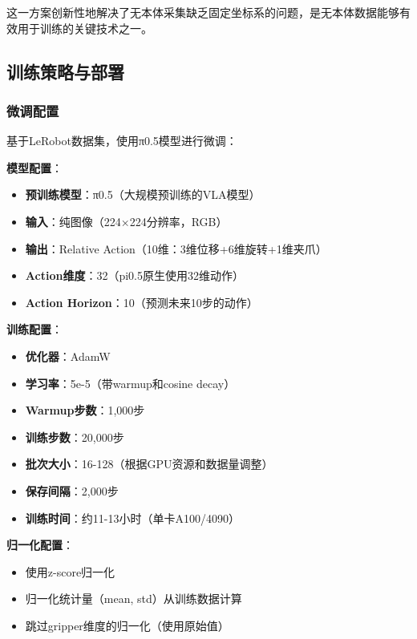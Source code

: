 这一方案创新性地解决了无本体采集缺乏固定坐标系的问题，是无本体数据能够有效用于训练的关键技术之一。

\subsection{训练策略与部署}

\subsubsection{微调配置}

基于LeRobot数据集\cite{lerobot2024}，使用π0.5模型\cite{pi0_5_2025}进行微调：

\textbf{模型配置}：
\begin{itemize}[leftmargin=2em]
    \item \textbf{预训练模型}：π0.5\cite{pi0_2024}（大规模预训练的VLA模型）
    \item \textbf{输入}：纯图像（224×224分辨率，RGB）
    \item \textbf{输出}：Relative Action（10维：3维位移+6维旋转+1维夹爪）
    \item \textbf{Action维度}：32（pi0.5原生使用32维动作）
    \item \textbf{Action Horizon}：10（预测未来10步的动作）
\end{itemize}

\textbf{训练配置}：
\begin{itemize}[leftmargin=2em]
    \item \textbf{优化器}：AdamW
    \item \textbf{学习率}：5e-5（带warmup和cosine decay）
    \item \textbf{Warmup步数}：1,000步
    \item \textbf{训练步数}：20,000步
    \item \textbf{批次大小}：16-128（根据GPU资源和数据量调整）
    \item \textbf{保存间隔}：2,000步
    \item \textbf{训练时间}：约11-13小时（单卡A100/4090）
\end{itemize}

\textbf{归一化配置}：
\begin{itemize}[leftmargin=2em]
    \item 使用z-score归一化
    \item 归一化统计量（mean, std）从训练数据计算
    \item 跳过gripper维度的归一化（使用原始值）
\end{itemize}

